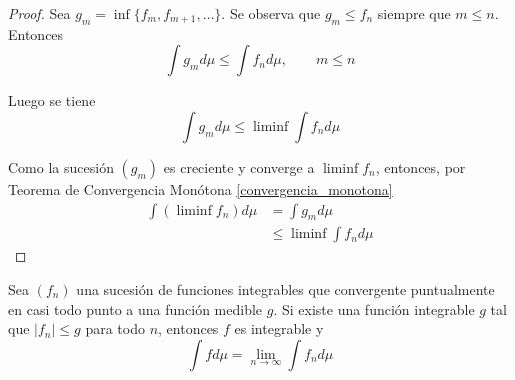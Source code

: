 \begin{proof}
	Sea $g_m = \inf \{ f_m,f_{m+1},\ldots \}$. Se observa que $g_m \leq f_n$ siempre que $m \leq n$. Entonces
	\begin{equation}
		\int g_m d\mu \leq \int f_n d\mu, \qquad m \leq n
	\end{equation}
	
	Luego se tiene
	\begin{equation}
		\int g_m d\mu \leq \liminf 	\int f_n d\mu
	\end{equation}
	
	Como la sucesión $(g_m)$ es creciente y converge a $\liminf f_n$, entonces, por Teorema de Convergencia Monótona \ref{convergencia_monotona}
	\begin{align}
		\int (\liminf f_n) d\mu &= \int g_m d\mu\\
		&\leq \liminf \int f_n d\mu
	\end{align}
\end{proof}

\begin{teorema}\label{convergencia_dominada}
	Sea $(f_n)$ una sucesión de funciones integrables que convergente puntualmente en casi todo punto  a una función medible $g$. Si existe una función integrable $g$ tal que $|f_n| \leq g$ para todo $n$, entonces $f$ es integrable y
	\begin{equation}
		\int f d\mu = \lim_{n \rightarrow \infty} \int f_n d\mu
	\end{equation}
\end{teorema}

